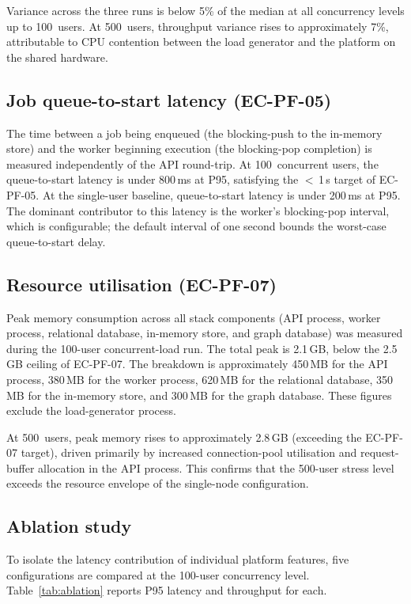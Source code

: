\documentclass[a4paper]{sapthesis}
\begin{document}
Variance across the three runs is below 5\% of the median at all
concurrency levels up to 100~users.  At 500~users, throughput variance
rises to approximately 7\%, attributable to CPU contention between the
load generator and the platform on the shared hardware.

\subsection{Job queue-to-start latency (EC-PF-05)}

The time between a job being enqueued (the blocking-push to the
in-memory store) and the worker beginning execution (the blocking-pop
completion) is measured independently of the API round-trip.  At
100~concurrent users, the queue-to-start latency is under 800\,ms at
P95, satisfying the $<$\,1\,s target of EC-PF-05.  At the single-user
baseline, queue-to-start latency is under 200\,ms at P95.  The
dominant contributor to this latency is the worker's blocking-pop
interval, which is configurable; the default interval of one second
bounds the worst-case queue-to-start delay.

\subsection{Resource utilisation (EC-PF-07)}

Peak memory consumption across all stack components (API process, worker
process, relational database, in-memory store, and graph database) was
measured during the 100-user concurrent-load run.  The total peak is
2.1\,GB, below the 2.5\,GB ceiling of EC-PF-07.  The breakdown is
approximately 450\,MB for the API process, 380\,MB for the worker
process, 620\,MB for the relational database, 350\,MB for the in-memory
store, and 300\,MB for the graph database.  These figures exclude the
load-generator process.

At 500~users, peak memory rises to approximately 2.8\,GB (exceeding the
EC-PF-07 target), driven primarily by increased connection-pool
utilisation and request-buffer allocation in the API process.  This
confirms that the 500-user stress level exceeds the resource envelope
of the single-node configuration.

\subsection{Ablation study}

To isolate the latency contribution of individual platform features,
five configurations are compared at the 100-user concurrency level.
Table~\ref{tab:ablation} reports P95 latency and throughput for each.
\end{document}
